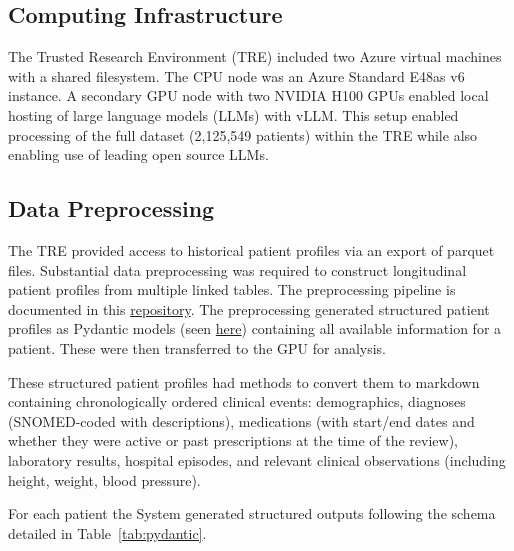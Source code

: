 \label{app:technical-infrastructure}
\subsection{Computing Infrastructure}

    The Trusted Research Environment (TRE) included two Azure virtual machines with a shared filesystem. The CPU node was an Azure Standard E48as v6 instance. A secondary GPU node with two NVIDIA H100 GPUs enabled local hosting of large language models (LLMs) with vLLM. This setup enabled processing of the full dataset (2,125,549 patients) within the TRE while also enabling use of leading open source LLMs.
    


\subsection{Data Preprocessing}
    The TRE provided access to historical patient profiles via an export of parquet files. Substantial data preprocessing was required to construct longitudinal patient profiles from multiple linked tables. The preprocessing pipeline is documented in this \href{https://github.com/i-dot-ai/medguard-preprocessing/tree/paper-analysis}{repository}. The preprocessing generated structured patient profiles as Pydantic models (seen \href{https://github.com/i-dot-ai/medguard-paper/blob/main/medguard-preprocessing/src/medguard/models.py}{here}) containing all available information for a patient. These were then transferred to the GPU for analysis.

    These structured patient profiles had methods to convert them to markdown containing chronologically ordered clinical events: demographics, diagnoses (SNOMED-coded with descriptions), medications (with start/end dates and whether they were active or past prescriptions at the time of the review), laboratory results, hospital episodes, and relevant clinical observations (including height, weight, blood pressure).

    For each patient the System generated structured outputs following the schema detailed in Table~\ref{tab:pydantic}. 

